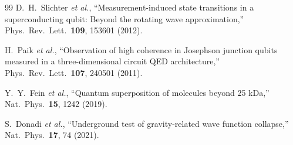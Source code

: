 \documentclass[aps,prd,twocolumn,superscriptaddress,nofootinbib]{revtex4-2}
\begin{document}
\begin{thebibliography}{99}
D.~H.~Slichter \emph{et al.}, ``Measurement-induced state transitions
in a superconducting qubit: Beyond the rotating wave approximation,''
Phys.\ Rev.\ Lett.\ \textbf{109}, 153601 (2012).

H.~Paik \emph{et al.}, ``Observation of high coherence in Josephson
junction qubits measured in a three-dimensional circuit QED
architecture,'' Phys.\ Rev.\ Lett.\ \textbf{107}, 240501 (2011).

Y.~Y.~Fein \emph{et al.}, ``Quantum superposition of molecules
beyond 25 kDa,'' Nat.\ Phys.\ \textbf{15}, 1242 (2019).

S.~Donadi \emph{et al.}, ``Underground test of gravity-related wave
function collapse,'' Nat.\ Phys.\ \textbf{17}, 74 (2021).

\end{thebibliography}
\end{document}
